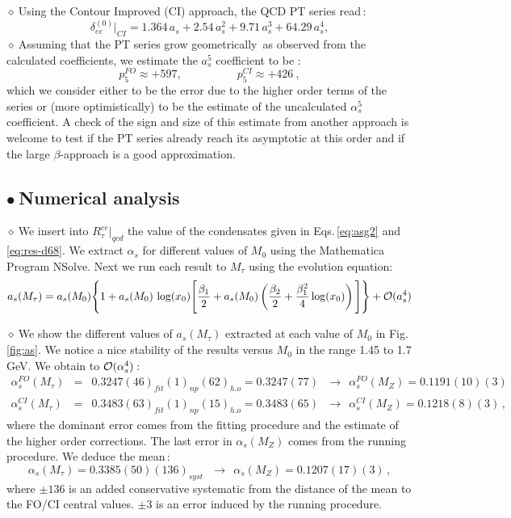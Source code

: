 \documentclass[review]{elsarticle}
\def\beq{\begin{equation}}
\def\eeq{\end{equation}}
\def\bea{\begin{eqnarray}}
\def\eea{\end{eqnarray}}
\def\nnb{\nonumber}
\def\ga{\left(}
\def\dr{\right)}
\def\nnb{\nonumber}
\def\b{$\bullet~$}
\def\d{$\diamond~$}
\begin{document}
  \d Using the Contour Improved (CI) approach, the QCD PT series read\,\cite{LEDI,CHET4}:
    \beq
  \delta^{(0)}_{ee}\vert_{CI}=1.364\,a_s+2.54\,a_s^2+9.71\,a_s^3+ 64.29\,a_s^4,
  \eeq
  \d  Assuming that the PT series grow geometrically\,\cite{SZ} as observed from the calculated coefficients, we estimate the $a_s^5$ coefficient to be :
  \beq
 p_5^ {FO}\approx +597, ~~~~~~~ ~~~~~~~~~~~~~~~p_5^{CI}\approx +426~,
  \label{eq:as5}
  \eeq
 which we consider either to be  the error due to the higher order terms of the series or (more optimistically) to be the estimate of the uncalculated $\alpha_s^5$ coefficient.  A check of the sign and size of this estimate  from another approach is welcome to test if the PT series already reach its asymptotic at this order and if the large $\beta$-approach  is a good approximation. 
  \subsection*{\b Numerical analysis}
 \d  We insert into   $R^{ee}_{\tau}\vert_{qcd}$ the value of the condensates given in Eqs.\,\ref{eq:asg2} and \ref{eq:res-d68}. We extract $\alpha_s$ for different values of $M_0$ using the Mathematica Program NSolve. Next we run each result to $M_\tau$ using the evolution equation:
  \beq
  a_s(M_\tau)=a_s(M_0)\Bigg{\{}1+ a_s(M_0)\,\log (x_0)\Bigg{[} \frac{\beta_1}{2}+a_s(M_0)\ga \frac{\beta_2}{2}
  +\frac{\beta_1^2}{4}\log (x_0)\dr \Bigg{]}\Bigg{\}}+{\cal O}(a_s^4)
  \eeq
  
  \d We show the different values of $a_s(M_\tau)$ extracted at each value of $M_0$ in Fig.\,\ref{fig:as}. We notice a nice stability of the results versus $M_0$ in the range 1.45 to 1.7 GeV. We obtain to ${\cal O}(\alpha_s^4)$\,:
  \bea
  \alpha_s^{FO}(M_\tau)&=&0.3247 (46)_{fit}(1)_{np} (62)_{h.o}=0.3247 (77)~~~\to~~  \alpha_s^{FO}(M_Z)=0.1191(10)(3)\, \nnb\\
   \alpha_s^{CI}(M_\tau)&=&0.3483 (63)_{fit}(1)_{np} (15)_{h.o}=0.3483 (65)~~~\to~~  \alpha_s^{CI}(M_Z)=0.1218(8)(3)\, ,
  \label{eq:alphas}
  \eea
 where the dominant error comes from the fitting procedure and the estimate of the higher order corrections.  The last error in $\alpha_s(M_Z)$ comes from the running procedure. We deduce the mean\,:
 \beq
  \alpha_s(M_\tau)=0.3385 (50)(136)_{syst}~~~\to~~  \alpha_s(M_Z)=0.1207(17)(3)\, ,
  \eeq
  where $\pm 136$ is an added conservative systematic from the distance of the mean to the FO/CI central values. $\pm 3 $ is
  an error induced by the running procedure. 
  
\end{document}
